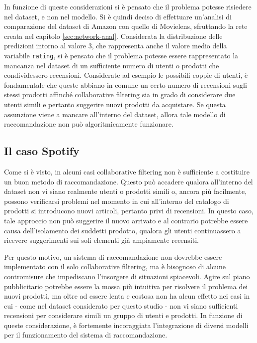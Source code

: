 \documentclass[hidelinks, 12pt]{article}
\begin{document}
In funzione di queste considerazioni si è pensato che il problema potesse risiedere nel dataset, e non nel modello. Si è quindi deciso di effettuare un'analisi di comparazione del dataset di Amazon con quello di Movielens, sfruttando la rete creata nel capitolo \ref{sec:network-anal}. Considerata la distribuzione delle predizioni intorno al valore 3, che rappresenta anche il valore medio della variabile \texttt{rating}, si è pensato che il problema potesse essere rappresentato la mancanza nel dataset di un sufficiente numero di utenti o prodotti che condividessero recensioni. Considerate ad esempio le possibili coppie di utenti, è fondamentale che queste abbiano in comune un certo numero di recensioni sugli stessi prodotti affinché collaborative filtering sia in grado di considerare due utenti simili e pertanto suggerire nuovi prodotti da acquistare. Se questa assunzione viene a mancare all'interno del dataset, allora tale modello di raccomandazione non può algoritmicamente funzionare.


\subsection{Il caso Spotify}
\label{sec:spotify}

Come si è visto, in alcuni casi collaborative filtering non è sufficiente a costituire un buon metodo di raccomandazione. Questo può accadere qualora all'interno del dataset non vi siano realmente utenti o prodotti simili o, ancora più facilmente, possono verificarsi problemi nel momento in cui all'interno del catalogo di prodotti si introducono nuovi articoli, pertanto privi di recensioni. In questo caso, tale approccio non può suggerire il nuovo arrivato e al contrario potrebbe essere causa dell'isolamento dei suddetti prodotto, qualora gli utenti continuassero a ricevere suggerimenti sui soli elementi già ampiamente recensiti.

Per questo motivo, un sistema di raccomandazione non dovrebbe essere implementato con il solo collaborative filtering, ma è bisognoso di alcune contromisure che impediscano l'insorgere di situazioni spiacevoli. Agire sul piano pubblicitario potrebbe essere la mossa più intuitiva per risolvere il problema dei nuovi prodotti, ma oltre ad essere lenta e costosa non ha alcun effetto nei casi in cui - come nel dataset considerato per questo studio - non vi siano sufficienti recensioni per considerare simili un gruppo di utenti e prodotti. In funzione di queste considerazione, è fortemente incoraggiata l'integrazione di diversi modelli per il funzionamento del sistema di raccomandazione.
\end{document}
